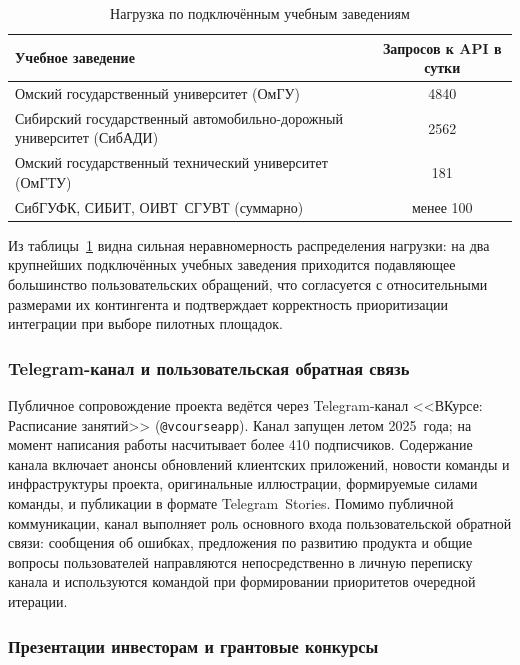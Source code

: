 \begin{table}[h]
  \caption{Нагрузка по подключённым учебным заведениям}
  \label{tab:eval-universities}
  \centering
  \small
  \begin{tabular}{p{} c}
    \toprule
    Учебное заведение & Запросов к API в сутки \\
    \midrule
    Омский государственный университет (ОмГУ)                & 4840 \\
    Сибирский государственный автомобильно-дорожный университет (СибАДИ) & 2562 \\
    Омский государственный технический университет (ОмГТУ)   & 181 \\
    СибГУФК, СИБИТ, ОИВТ~СГУВТ (суммарно)                    & менее 100 \\
    \bottomrule
  \end{tabular}
\end{table}

Из таблицы~\ref{tab:eval-universities} видна сильная неравномерность распределения нагрузки: на два крупнейших подключённых учебных заведения приходится подавляющее большинство пользовательских обращений, что согласуется с относительными размерами их контингента и подтверждает корректность приоритизации интеграции при выборе пилотных площадок.

\subsubsection{Telegram-канал и пользовательская обратная связь}
\label{subsubsec:impl-eval-telegram}

Публичное сопровождение проекта ведётся через Telegram-канал <<ВКурсе: Расписание занятий>> (\texttt{@vcourseapp}). Канал запущен летом 2025~года; на момент написания работы насчитывает более 410 подписчиков. Содержание канала включает анонсы обновлений клиентских приложений, новости команды и инфраструктуры проекта, оригинальные иллюстрации, формируемые силами команды, и публикации в формате Telegram~Stories. Помимо публичной коммуникации, канал выполняет роль основного входа пользовательской обратной связи: сообщения об ошибках, предложения по развитию продукта и общие вопросы пользователей направляются непосредственно в личную переписку канала и используются командой при формировании приоритетов очередной итерации.

\subsubsection{Презентации инвесторам и грантовые конкурсы}
\label{subsubsec:impl-eval-grants}

